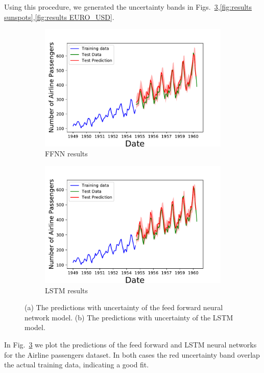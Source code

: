 \documentclass[10pt,a4paper]{article}
\begin{document}
Using this procedure, we generated the uncertainty bands in Figs.~\ref{fig:results Airline},\ref{fig:results sunspots},\ref{fig:results EURO_USD}.
\begin{figure}[h]
\centering
\begin{subfigure}{.5\textwidth}
  \centering
  \includegraphics[scale=0.41]{Airline_Passengers_NN.pdf}
  \caption{FFNN results}
  \label{fig:NN results Airline}
\end{subfigure}%
\begin{subfigure}{.5\textwidth}
  \centering
  \includegraphics[scale=0.41]{Airline_Passengers_LSTN.pdf}
  \caption{LSTM results}
  \label{fig:LSTM results Airline}
\end{subfigure}
\caption{(a) The predictions with uncertainty of the feed forward neural network model. (b) The predictions with uncertainty of the LSTM model. }
\label{fig:results Airline}
\end{figure}
In Fig.~\ref{fig:results Airline} we plot the predictions of the feed forward and LSTM neural networks for the Airline passengers dataset. In both cases the red uncertainty band overlap the actual training data, indicating a good fit.
\end{document}
